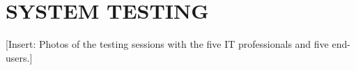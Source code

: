 \chapter{SYSTEM TESTING}
[Insert: Photos of the testing sessions with the five IT professionals and five end-users.]
